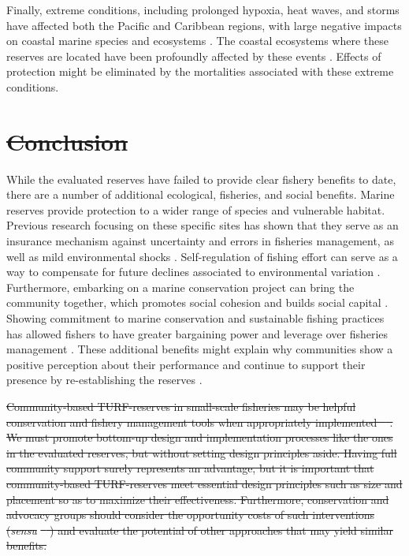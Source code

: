 \documentclass[10pt,letterpaper]{article}
\providecommand{\DIFdeltex}[1]{{\protect\color{red}\sout{#1}}}                      %
\providecommand{\DIFdelbegin}{} %
\providecommand{\DIFdelend}{} %
\providecommand{\DIFdel}[1]{\texorpdfstring{\DIFdeltex{#1}}{}} %
\newcommand{\DIFscaledelfig}{0.5}
\newlength{\DIFdelgraphicswidth} %
\newlength{\DIFdelgraphicsheight} %
\newcommand{\DIFdelincludegraphics}[2][]{%
\sbox{\DIFdelgraphicsbox}{\DIFOincludegraphics[#1]{#2}}%
\settoboxwidth{\DIFdelgraphicswidth}{\DIFdelgraphicsbox} %
\settoboxtotalheight{\DIFdelgraphicsheight}{\DIFdelgraphicsbox} %
\scalebox{\DIFscaledelfig}{%
\parbox[b]{\DIFdelgraphicswidth}{\usebox{\DIFdelgraphicsbox}\\[-\baselineskip] \rule{\DIFdelgraphicswidth}{0em}}\llap{\resizebox{\DIFdelgraphicswidth}{\DIFdelgraphicsheight}{%
\setlength{\unitlength}{\DIFdelgraphicswidth}%
\begin{picture}(1,1)%
\thicklines\linethickness{2pt} %
{\color[rgb]{1,0,0}\put(0,0){\framebox(1,1){}}}%
{\color[rgb]{1,0,0}\put(0,0){\line( 1,1){1}}}%
{\color[rgb]{1,0,0}\put(0,1){\line(1,-1){1}}}%
\end{picture}%
}\hspace*{3pt}}} %
} %
\DeclareRobustCommand{\DIFdelbegin}{\DIFOdelbegin \let\includegraphics\DIFdelincludegraphics} %
\DeclareRobustCommand{\DIFdelend}{\DIFOaddend \let\includegraphics\DIFOincludegraphics} %
\begin{document}
Finally, extreme conditions, including prolonged hypoxia, heat waves, and storms have affected both the Pacific and Caribbean regions, with large negative impacts on coastal marine species and ecosystems \cite{cavole_2016,hughes_2018,breitburg_2018}. The coastal ecosystems where these reserves are located have been profoundly affected by these events \cite{micheli_2012-EU,woodson_2018}. Effects of protection might be eliminated by the mortalities associated with these extreme conditions.

\DIFdelbegin \section*{\DIFdel{Conclusion}}

\DIFdelend While the evaluated reserves have failed to provide clear fishery benefits to date, there are a number of additional ecological, fisheries, and social benefits. Marine reserves provide protection to a wider range of species and vulnerable habitat. Previous research focusing on these specific sites has shown that they serve as an insurance mechanism against uncertainty and errors in fisheries management, as well as mild environmental shocks \cite{micheli_2012-EU,deleo_2015,roberts_2017-J9,aalto}. Self-regulation of fishing effort can serve as a way to compensate for future declines associated to environmental variation \cite{finkbeiner_2018}. Furthermore, embarking on a marine conservation project can bring the community together, which promotes social cohesion and builds social capital \cite{fulton_2019}. Showing commitment to marine conservation and sustainable fishing practices has allowed fishers to have greater bargaining power and leverage over fisheries management \cite{prezramrez_2012}. These additional benefits might explain why communities show a positive perception about their performance and continue to support their presence by re-establishing the reserves \cite{ayer_2018}.

\DIFdelbegin \DIFdel{Community-based TURF-reserves in small-scale fisheries may be helpful conservation and fishery management tools when appropriately implemented \mbox{%
\cite{gelcich_2015}}\hspace{0pt}%
. We must promote bottom-up design and implementation processes like the ones in the evaluated reserves, but without setting design principles aside. Having full community support surely represents an advantage, but it is important that community-based TURF-reserves meet essential design principles such as size and placement so as to maximize their effectiveness. Furthermore, conservation and advocacy groups should consider the opportunity costs of such interventions (}\emph{\DIFdel{sensu}} %
\DIFdel{\mbox{%
\cite{smith_2010}}\hspace{0pt}%
) and evaluate the potential of other approaches that may yield similar benefits.
}%
\end{document}

